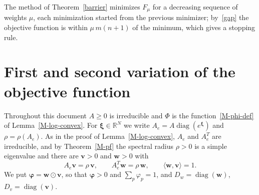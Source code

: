 \documentclass[11pt]{article}
\theoremstyle{plain}
\theoremstyle{remark}
\numberwithin{equation}{section}
\begin{document}
The method of Theorem~\ref{barrier} minimizes $F_{\mu}$ for a decreasing
sequence of weights $\mu$, each minimization started from the previous
minimizer; by~\eqref{gap} the objective function is within $\mu\,m(n+1)$ of the
minimum, which gives a stopping rule.

\section{First and second variation of the objective function}\label{sec-variation}

Throughout this document $A\ge 0$ is irreducible and $\Phi$ is the
function~\eqref{M-phi-def} of Lemma~\ref{M-log-convex}. For
$\bm\xi\in\mathbb{R}^N$ we write $A_e=A\operatorname{diag}\left(e^{\bm\xi}\right)$
and $\rho=\rho(A_e)$. As in the proof of Lemma~\ref{M-log-convex}, $A_e$ and $A_e^T$
are irreducible, and by Theorem~\ref{M-pf} the spectral radius $\rho>0$ is a
simple eigenvalue and there are $\bm v>0$ and $\bm w>0$ with
\begin{equation}\label{v-perron}
A_e\bm v=\rho\,\bm v,\qquad A_e^T\bm w=\rho\,\bm w,\qquad \langle\bm w,\bm v\rangle=1 .
\end{equation}
We put $\bm\varphi=\bm w\odot\bm v$, so that $\bm\varphi>0$ and
$\sum_p\varphi_p=1$, and $D_w=\operatorname{diag}(\bm w)$,
$D_v=\operatorname{diag}(\bm v)$.
\end{document}
